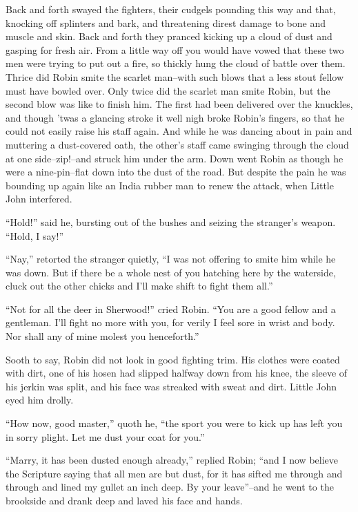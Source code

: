 Back and forth swayed the fighters, their cudgels pounding this way and
that, knocking off splinters and bark, and threatening direst damage to
bone and muscle and skin. Back and forth they pranced kicking up a cloud
of dust and gasping for fresh air. From a little way off you would have
vowed that these two men were trying to put out a fire, so thickly hung
the cloud of battle over them. Thrice did Robin smite the scarlet
man--with such blows that a less stout fellow must have bowled over.
Only twice did the scarlet man smite Robin, but the second blow was like
to finish him. The first had been delivered over the knuckles, and
though 'twas a glancing stroke it well nigh broke Robin's fingers, so
that he could not easily raise his staff again. And while he was dancing
about in pain and muttering a dust-covered oath, the other's staff came
swinging through the cloud at one side--zip!--and struck him under the
arm. Down went Robin as though he were a nine-pin--flat down into the
dust of the road. But despite the pain he was bounding up again like an
India rubber man to renew the attack, when Little John interfered.

``Hold!'' said he, bursting out of the bushes and seizing the stranger's
weapon. ``Hold, I say!''

``Nay,'' retorted the stranger quietly, ``I was not offering to smite
him while he was down. But if there be a whole nest of you hatching here
by the waterside, cluck out the other chicks and I'll make shift to
fight them all.''

``Not for all the deer in Sherwood!'' cried Robin. ``You are a good
fellow and a gentleman. I'll fight no more with you, for verily I feel
sore in wrist and body. Nor shall any of mine molest you henceforth.''

Sooth to say, Robin did not look in good fighting trim. His clothes were
coated with dirt, one of his hosen had slipped halfway down from his
knee, the sleeve of his jerkin was split, and his face was streaked with
sweat and dirt. Little John eyed him drolly.

``How now, good master,'' quoth he, ``the sport you were to kick up has
left you in sorry plight. Let me dust your coat for you.''

``Marry, it has been dusted enough already,'' replied Robin; ``and I now
believe the Scripture saying that all men are but dust, for it has
sifted me through and through and lined my gullet an inch deep. By your
leave''--and he went to the brookside and drank deep and laved his face
and hands.

